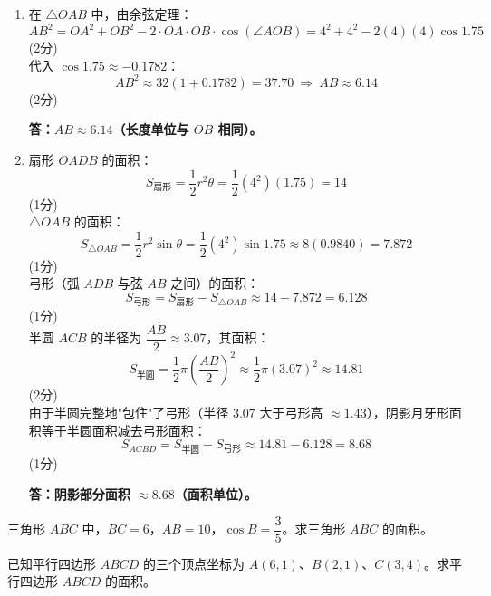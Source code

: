 \documentclass[12pt,a4paper]{exam-zh}
\newcommand{\qscore}[1]{%
    \unskip\nobreak\hfill
    \makebox[0pt][l]{\makebox[4em][r]{(#1\%)}}%
}
\begin{document}
\begin{solution}
    \begin{enumerate}[label=(\alph*)]
        \item 在 $\triangle OAB$ 中，由余弦定理：
        \[ \displaystyle AB^{2} = OA^{2} + OB^{2} - 2\cdot OA\cdot OB\cdot\cos(\angle AOB) = 4^{2}+4^{2}-2(4)(4)\cos 1.75 \] \hfill (2分) \\
        代入 $\cos 1.75 \approx -0.1782$：
        \[ \displaystyle AB^{2} \approx 32(1+0.1782) = 37.70 \ \Longrightarrow\ AB \approx 6.14 \] \hfill (2分)

        \textbf{答：$AB \approx 6.14$（长度单位与 $OB$ 相同）。}

        \item 扇形 $OADB$ 的面积：
        \[ \displaystyle S_{\text{扇形}} = \frac{1}{2}r^{2}\theta = \frac{1}{2}(4^{2})(1.75) = 14 \] \hfill (1分) \\
        $\triangle OAB$ 的面积：
        \[ \displaystyle S_{\triangle OAB} = \frac{1}{2}r^{2}\sin\theta = \frac{1}{2}(4^{2})\sin 1.75 \approx 8(0.9840) = 7.872 \] \hfill (1分) \\
        弓形（弧 $ADB$ 与弦 $AB$ 之间）的面积：
        \[ \displaystyle S_{\text{弓形}} = S_{\text{扇形}} - S_{\triangle OAB} \approx 14 - 7.872 = 6.128 \] \hfill (1分) \\
        半圆 $ACB$ 的半径为 $\dfrac{AB}{2}\approx 3.07$，其面积：
        \[ \displaystyle S_{\text{半圆}} = \frac{1}{2}\pi\left(\frac{AB}{2}\right)^{2} \approx \frac{1}{2}\pi(3.07)^{2} \approx 14.81 \] \hfill (2分) \\
        由于半圆完整地"包住"了弓形（半径 $3.07$ 大于弓形高 $\approx 1.43$），阴影月牙形面积等于半圆面积减去弓形面积：
        \[ \displaystyle S_{ACBD} = S_{\text{半圆}} - S_{\text{弓形}} \approx 14.81 - 6.128 = 8.68 \] \hfill (1分)

        \textbf{答：阴影部分面积 $\approx 8.68$（面积单位）。}
    \end{enumerate}
\end{solution}

\begin{question}[points = 10]
    \begin{questionparts}
        \item 三角形 $ABC$ 中，$BC = 6$，$AB = 10$，$\cos B = \dfrac{3}{5}$。求三角形 $ABC$ 的面积。\qscore{4}

        \item 已知平行四边形 $ABCD$ 的三个顶点坐标为 $A(6, 1)$、$B(2, 1)$、$C(3, 4)$。求平行四边形 $ABCD$ 的面积。\qscore{4}
    \end{questionparts}
\end{question}
\end{document}
